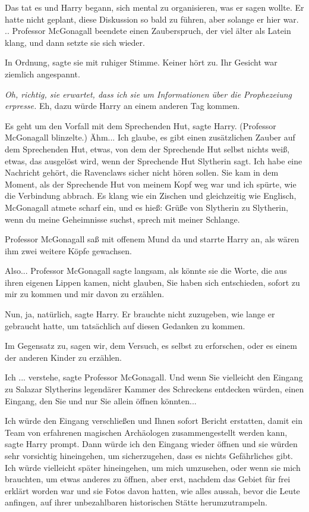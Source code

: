 Das tat es und Harry begann, sich mental zu organisieren, was er sagen wollte.
Er hatte nicht geplant, diese Diskussion so bald zu führen, aber solange er hier
war. .. Professor McGonagall beendete einen Zauberspruch, der viel älter als
Latein klang, und dann setzte sie sich wieder.

\glqq In Ordnung\grqq{}, sagte sie mit ruhiger Stimme. \glqq Keiner hört
zu.\grqq{} Ihr Gesicht war ziemlich angespannt.

\emph{Oh, richtig, sie erwartet, dass ich sie um Informationen über die
Prophezeiung erpresse.} Eh, dazu würde Harry an einem anderen Tag kommen.

\glqq Es geht um den Vorfall mit dem Sprechenden Hut\grqq{}, sagte Harry.
(Professor McGonagall blinzelte.) \glqq Ähm... Ich glaube, es gibt einen
zusätzlichen Zauber auf dem Sprechenden Hut, etwas, von dem der Sprechende Hut
selbst nichts weiß, etwas, das ausgelöst wird, wenn der Sprechende Hut Slytherin
sagt. Ich habe eine Nachricht gehört, die Ravenclaws sicher nicht hören sollen.
Sie kam in dem Moment, als der Sprechende Hut von meinem Kopf weg war und ich
spürte, wie die Verbindung abbrach. Es klang wie ein Zischen und gleichzeitig
wie Englisch\grqq{}, McGonagall atmete scharf ein, \glqq und es hieß: Grüße von
Slytherin zu Slytherin, wenn du meine Geheimnisse suchst, sprech mit meiner
Schlange.\grqq{}

Professor McGonagall saß mit offenem Mund da und starrte Harry an, als wären ihm
zwei weitere Köpfe gewachsen.

\glqq Also...\grqq{} Professor McGonagall sagte langsam, als könnte sie die
Worte, die aus ihren eigenen Lippen kamen, nicht glauben, \glqq Sie haben sich
entschieden, sofort zu mir zu kommen und mir davon zu erzählen.\grqq{}

\glqq Nun, ja, natürlich\grqq{}, sagte Harry. Er brauchte nicht zuzugeben, wie
lange er gebraucht hatte, um tatsächlich auf diesen Gedanken zu kommen.

\glqq Im Gegensatz zu, sagen wir, dem Versuch, es selbst zu erforschen, oder es
einem der anderen Kinder zu erzählen.\grqq{}

\glqq Ich ... verstehe\grqq{}, sagte Professor McGonagall. \glqq Und wenn Sie
vielleicht den Eingang zu Salazar Slytherins legendärer Kammer des Schreckens
entdecken würden, einen Eingang, den Sie und nur Sie allein öffnen
könnten...\grqq{}

\glqq Ich würde den Eingang verschließen und Ihnen sofort Bericht erstatten,
damit ein Team von erfahrenen magischen Archäologen zusammengestellt werden
kann\grqq{}, sagte Harry prompt. \glqq Dann würde ich den Eingang wieder öffnen
und sie würden sehr vorsichtig hineingehen, um sicherzugehen, dass es nichts
Gefährliches gibt. Ich würde vielleicht später hineingehen, um mich umzusehen,
oder wenn sie mich brauchten, um etwas anderes zu öffnen, aber erst, nachdem das
Gebiet für frei erklärt worden war und sie Fotos davon hatten, wie alles aussah,
bevor die Leute anfingen, auf ihrer unbezahlbaren historischen Stätte
herumzutrampeln.\grqq{}

